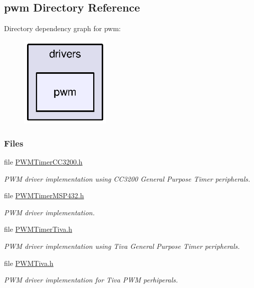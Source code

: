 \subsection{pwm Directory Reference}
\label{dir_cad17b9f769a17e178b8a9a80c710d7b}
Directory dependency graph for pwm\+:
\nopagebreak
\begin{figure}[H]
\begin{center}
\leavevmode
\includegraphics[width=123pt]{dir_cad17b9f769a17e178b8a9a80c710d7b_dep}
\end{center}
\end{figure}
\subsubsection*{Files}
\begin{DoxyCompactItemize}
\item 
file \hyperlink{_p_w_m_timer_c_c3200_8h}{P\+W\+M\+Timer\+C\+C3200.\+h}
\begin{DoxyCompactList}\small\item\em P\+W\+M driver implementation using C\+C3200 General Purpose Timer peripherals. \end{DoxyCompactList}\item 
file \hyperlink{_p_w_m_timer_m_s_p432_8h}{P\+W\+M\+Timer\+M\+S\+P432.\+h}
\begin{DoxyCompactList}\small\item\em P\+W\+M driver implementation. \end{DoxyCompactList}\item 
file \hyperlink{_p_w_m_timer_tiva_8h}{P\+W\+M\+Timer\+Tiva.\+h}
\begin{DoxyCompactList}\small\item\em P\+W\+M driver implementation using Tiva General Purpose Timer peripherals. \end{DoxyCompactList}\item 
file \hyperlink{_p_w_m_tiva_8h}{P\+W\+M\+Tiva.\+h}
\begin{DoxyCompactList}\small\item\em P\+W\+M driver implementation for Tiva P\+W\+M perhiperals. \end{DoxyCompactList}\end{DoxyCompactItemize}
